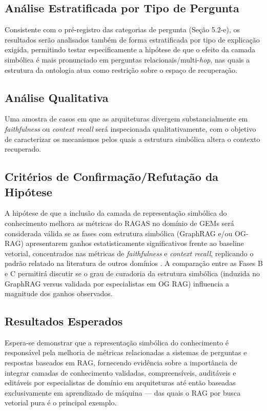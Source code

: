 \documentclass{article}
\begin{document}
	\subsection{Análise Estratificada por Tipo de Pergunta}
	
	Consistente com o pré-registro das categorias de pergunta (Seção 5.2-e), os resultados serão analisados também de forma estratificada por tipo de explicação exigida, permitindo testar especificamente a hipótese de que o efeito da camada simbólica é mais pronunciado em perguntas relacionais/multi-\textit{hop}, nas quais a estrutura da ontologia atua como restrição sobre o espaço de recuperação.
	
	\subsection{Análise Qualitativa}
	
	Uma amostra de casos em que as arquiteturas divergem substancialmente em \textit{faithfulness} ou \textit{context recall} será inspecionada qualitativamente, com o objetivo de caracterizar os mecanismos pelos quais a estrutura simbólica altera o contexto recuperado.
	
	\subsection{Critérios de Confirmação/Refutação da Hipótese}
	
	A hipótese de que a inclusão da camada de representação simbólica do conhecimento melhora as métricas do RAGAS no domínio de GEMs será considerada válida se as fases com estrutura simbólica (GraphRAG e/ou OG-RAG) apresentarem ganhos estatisticamente significativos frente ao baseline vetorial, concentrados nas métricas de \textit{faithfulness} e \textit{context recall}, replicando o padrão relatado na literatura de outros domínios \cite{sharma2025ograg,feng2025ontologyrag,kalra2024hyparag,nie2025aml}. A comparação entre as Fases B e C permitirá discutir se o grau de curadoria da estrutura simbólica (induzida no GraphRAG versus validada por especialistas em OG RAG) influencia a magnitude dos ganhos observados.
	
	\subsection{Resultados Esperados}
	
	Espera-se demonstrar que a representação simbólica do conhecimento é responsável pela melhoria de métricas relacionadas a sistemas de perguntas e respostas baseados em RAG, fornecendo evidência sobre a importância de integrar camadas de conhecimento validadas, compreensíveis, auditáveis e editáveis por especialistas de domínio em arquiteturas até então baseadas exclusivamente em aprendizado de máquina --- das quais o RAG por busca vetorial pura é o principal exemplo.
	
\end{document}
